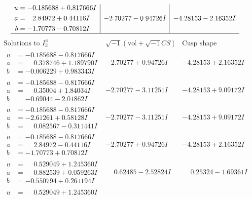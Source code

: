 \documentclass[1p]{elsarticle_modified}
\theoremstyle{definition}
\newcommand{\I}{\sqrt{-1}}
\begin{document}
$$\begin{array}{c|c|c}
\begin{aligned}
u &= -0.185688 + 0.817666 I \\
a &= \phantom{-}2.84972 + 0.44116 I \\
b &= -1.70773 - 0.70812 I\end{aligned}
 & -2.70277 - 0.94726 I & -4.28153 - 2.16352 I\\
 \hline 
 \end{array}$$\newpage$$\begin{array}{c|c|c}  
\text{Solutions to }I^u_{3}& \I (\text{vol} + \sqrt{-1}CS) & \text{Cusp shape}\\
 \hline 
\begin{aligned}
u &= -0.185688 - 0.817666 I \\
a &= \phantom{-}0.378746 + 1.189790 I \\
b &= -0.006229 + 0.983343 I\end{aligned}
 & -2.70277 + 0.94726 I & -4.28153 + 2.16352 I \\ \hline\begin{aligned}
u &= -0.185688 - 0.817666 I \\
a &= \phantom{-}0.35004 + 1.84034 I \\
b &= -0.69044 - 2.01862 I\end{aligned}
 & -2.70277 - 3.11251 I & -4.28153 + 9.09172 I \\ \hline\begin{aligned}
u &= -0.185688 - 0.817666 I \\
a &= -2.61261 + 0.58128 I \\
b &= \phantom{-}0.082567 - 0.311441 I\end{aligned}
 & -2.70277 - 3.11251 I & -4.28153 + 9.09172 I \\ \hline\begin{aligned}
u &= -0.185688 - 0.817666 I \\
a &= \phantom{-}2.84972 - 0.44116 I \\
b &= -1.70773 + 0.70812 I\end{aligned}
 & -2.70277 + 0.94726 I & -4.28153 + 2.16352 I \\ \hline\begin{aligned}
u &= \phantom{-}0.529049 + 1.245360 I \\
a &= \phantom{-}0.882539 + 0.059263 I \\
b &= -0.550794 + 0.261194 I\end{aligned}
 & \phantom{-}0.62485 - 2.52824 I & \phantom{-}0.25324 - 1.69361 I \\ \hline\begin{aligned}
u &= \phantom{-}0.529049 + 1.245360 I \\

\end{aligned}
\end{array}$$
\end{document}
